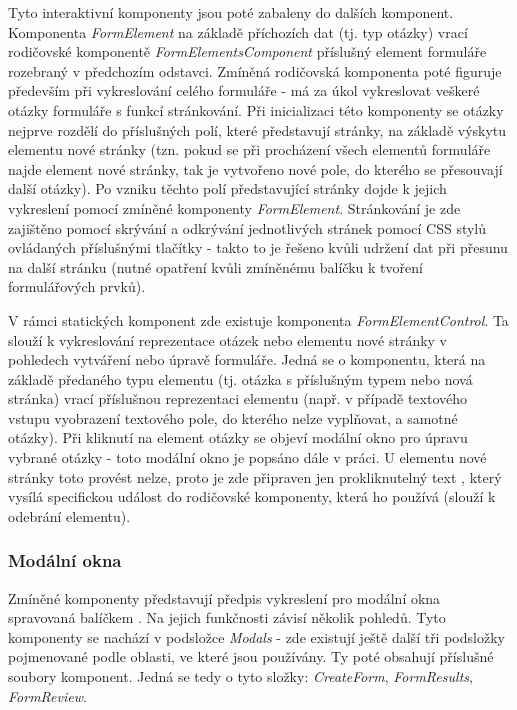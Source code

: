 		Tyto interaktivní komponenty jsou poté zabaleny do dalších komponent. Komponenta \textit{FormElement} na základě příchozích dat (tj. typ otázky) vrací rodičovské komponentě \textit{FormElementsComponent} příslušný element formuláře rozebraný v předchozím odstavci. Zmíněná rodičovská komponenta poté figuruje především při vykreslování celého formuláře - má za úkol vykreslovat veškeré otázky formuláře s funkcí stránkování. Při inicializaci této komponenty se otázky nejprve rozdělí do příslušných polí, které představují stránky, na základě výskytu elementu nové stránky (tzn. pokud se při procházení všech elementů formuláře najde element nové stránky, tak je vytvořeno nové pole, do kterého se přesouvají další otázky). Po vzniku těchto polí představující stránky dojde k jejich vykreslení pomocí zmíněné komponenty \textit{FormElement}. Stránkování je zde zajištěno pomocí skrývání a odkrývání jednotlivých stránek pomocí CSS stylů ovládaných příslušnými tlačítky - takto to je řešeno kvůli udržení dat při přesunu na další stránku (nutné opatření kvůli zmíněnému balíčku k tvoření formulářových prvků).
		
		V rámci statických komponent zde existuje komponenta \textit{FormElementControl}. Ta slouží k vykreslování reprezentace otázek nebo elementu nové stránky v pohledech vytváření nebo úpravě formuláře. Jedná se o komponentu, která na základě předaného typu elementu (tj. otázka s příslušným typem nebo nová stránka) vrací příslušnou reprezentaci elementu (např. v případě textového vstupu vyobrazení textového pole, do kterého nelze vyplňovat, a samotné otázky). Při kliknutí na element otázky se objeví modální okno pro úpravu vybrané otázky - toto modální okno je popsáno dále v práci. U elementu nové stránky toto provést nelze, proto je zde připraven jen prokliknutelný text , který vysílá specifickou událost do rodičovské komponenty, která ho používá (slouží k odebrání elementu).
	
		\subsubsection{Modální okna} \label{sec:komp_modal} %
		Zmíněné komponenty představují předpis vykreslení pro modální okna spravovaná balíčkem . Na jejich funkčnosti závisí několik pohledů. Tyto komponenty se nachází v podsložce \textit{Modals} - zde existují ještě další tři podsložky pojmenované podle oblasti, ve které jsou používány. Ty poté obsahují příslušné soubory komponent. Jedná se tedy o tyto složky: \textit{CreateForm}, \textit{FormResults}, \textit{FormReview}. 
		
